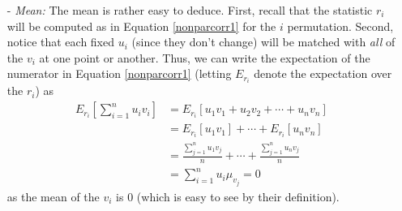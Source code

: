 \documentclass[a4paper,12pt]{scrartcl}
\begin{document}
\begin{itemize}
   \item[-] {\sl Mean:} The mean is rather easy to deduce.
      First, recall
      that the statistic $r_i$ will be computed as in
      Equation \ref{nonparcorr1} for the $i$ permutation. Second,
      notice that each fixed $u_i$ (since they don't change)
      will be matched with \emph{all} of the $v_i$ at one point or
      another.  Thus, we can write the expectation of the
      numerator in Equation \ref{nonparcorr1} (letting $E_{r_i}$ denote
      the expectation over the $r_i$) as
      \begin{align*}
	 E_{r_i}\left[\sum_{i=1}^n u_i v_i\right] &=
	    E_{r_i}\left[u_1 v_1 + u_2 v_2 + \cdots + u_n v_n\right]\\
	    &= E_{r_i}\left[u_1 v_1\right]+\cdots
	       + E_{r_i}\left[ u_n v_n\right]\\
	 &= \frac{\sum_{j=1}^n u_1 v_j}{n} + \cdots
	 + \frac{\sum_{j=1}^n u_n v_j}{n}\\
	 &= \sum_{i=1}^n u_i \mu_{v_j}= 0
      \end{align*}
      as the mean of the $v_i$ is 0 (which is easy to see by their
      definition).


\end{itemize}
\end{document}
